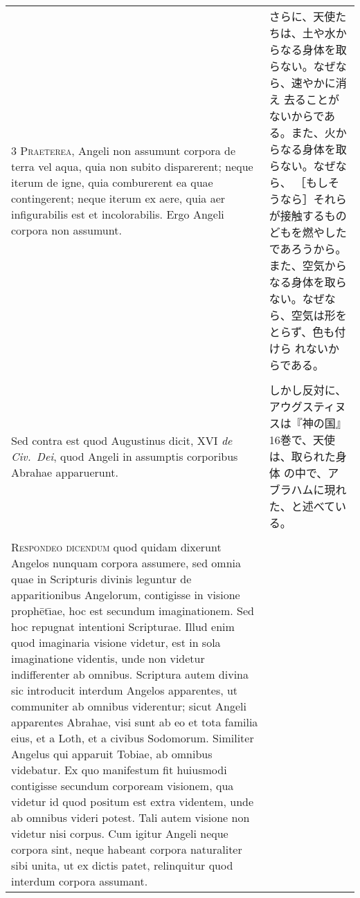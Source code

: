 \documentclass[10pt]{jsarticle} %
\begin{document}
\begin{longtable}{p{21em}p{21em}}
{\scshape 3 Praeterea}, Angeli non assumunt corpora de
terra vel aqua, quia non subito disparerent; neque iterum de igne, quia
comburerent ea quae contingerent; neque iterum ex aere, quia aer
infigurabilis est et incolorabilis. Ergo Angeli corpora non assumunt.

&
さらに、天使たちは、土や水からなる身体を取らない。なぜなら、速やかに消え
 去ることがないからである。また、火からなる身体を取らない。なぜなら、
 ［もしそうなら］それらが接触するものどもを燃やしたであろうから。
また、空気からなる身体を取らない。なぜなら、空気は形をとらず、色も付けら
 れないからである。

\\\\


Sed contra est quod Augustinus dicit, XVI {\itshape de
Civ.~Dei}, quod Angeli in assumptis corporibus Abrahae apparuerunt.

&
しかし反対に、アウグスティヌスは『神の国』16巻で、天使は、取られた身体
 の中で、アブラハムに現れた、と述べている。

\\\\


{\scshape Respondeo dicendum} quod quidam dixerunt
Angelos nunquam corpora assumere, sed omnia quae in Scripturis divinis
leguntur de apparitionibus Angelorum, contigisse in visione proph\={e}t\={\i}ae,
hoc est secundum imaginationem. Sed hoc repugnat intentioni
Scripturae. Illud enim quod imaginaria visione videtur, est in sola
imaginatione videntis, unde non videtur indifferenter ab
omnibus. Scriptura autem divina sic introducit interdum Angelos
apparentes, ut communiter ab omnibus viderentur; sicut Angeli apparentes
Abrahae, visi sunt ab eo et tota familia eius, et a Loth, et a civibus
Sodomorum. Similiter Angelus qui apparuit Tobiae, ab omnibus
videbatur. Ex quo manifestum fit huiusmodi contigisse secundum corpoream
visionem, qua videtur id quod positum est extra videntem, unde ab
omnibus videri potest. Tali autem visione non videtur nisi corpus. Cum
igitur Angeli neque corpora sint, neque habeant corpora naturaliter sibi
unita, ut ex dictis patet, relinquitur quod interdum corpora assumant.


\end{longtable}
\end{document}

